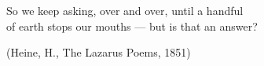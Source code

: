 \begin{epigrafe}
    So we keep asking, over and over, until a handful \\
    of earth stops our mouths — but is that an answer?

    (Heine, H., The Lazarus Poems, 1851)
\end{epigrafe}